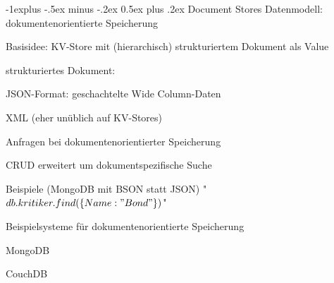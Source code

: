\documentclass[a4paper]{article}
\makeatletter
\renewcommand{\subsection}{\@startsection{subsection}{2}{0mm}%
                                {-1explus -.5ex minus -.2ex}%
                                {0.5ex plus .2ex}%
                                {\normalfont\normalsize\bfseries}}
\makeatother
\begin{document}
\begin{multicols}{3}
\begin{itemize*}
        \subsection{Document Stores}
        Datenmodell: dokumentenorientierte Speicherung
        \begin{itemize*}
            \item Basisidee: KV-Store mit (hierarchisch) strukturiertem Dokument als Value
            \item strukturiertes Dokument:
            \begin{itemize*}
                \item JSON-Format: geschachtelte Wide Column-Daten
                \item XML (eher unüblich auf KV-Stores)
            \end{itemize*}
            \item Anfragen bei dokumentenorientierter Speicherung
            \begin{itemize*}
                \item CRUD erweitert um dokumentspezifische Suche
                \item Beispiele (MongoDB mit BSON statt JSON) "$db.kritiker.find(\{Name: "Bond"\})$"
            \end{itemize*}
            \item Beispielsysteme für dokumentenorientierte Speicherung
            \begin{itemize*}
                \item MongoDB
                \item CouchDB
            \end{itemize*}
        \end{itemize*}


\end{itemize*}
\end{multicols}
\end{document}
